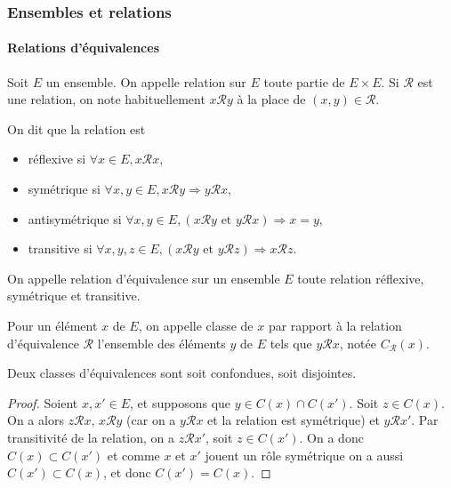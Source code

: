 \subsubsection{Ensembles et relations}

\paragraph{Relations d'équivalences}

\begin{de}
Soit $E$ un ensemble. On appelle relation sur $E$ toute
partie de $E \times E$. Si $\mathcal{R}$ est une relation, on note habituellement $x\mathcal{R}y$ à la
place de $(x,y) \in\mathcal{R}$.

On dit que la relation est

\begin{itemize}

\item
  réflexive si $\forall x \in E, x\mathcal{R}x$,
\item
  symétrique si $\forall x,y \in E, x\mathcal{R}y \Rightarrow y\mathcal{R}x$,
\item
  antisymétrique si $\forall x,y \in E, (x\mathcal{R}y\text{ et } y\mathcal{R}x) \Rightarrow x = y$,
\item
  transitive si $\forall x,y,z \in E, (x\mathcal{R}y\text{ et } y\mathcal{R}z) \Rightarrow x\mathcal{R}z$.
\end{itemize}
\end{de}

\begin{de}
On appelle relation d'équivalence sur un ensemble $E$
toute relation réflexive, symétrique et transitive.
\end{de}

\begin{de}
Pour un élément $x$ de $E$, on appelle classe de $x$ par
rapport à la relation d'équivalence $\mathcal{R}$ l'ensemble des éléments $y$ de $E$
tels que $y\mathcal{R}x$, notée $C_{\mathcal{R}}(x)$.
\end{de}

\begin{prop}
Deux classes d'équivalences sont soit confondues, soit
disjointes.
\end{prop}

\begin{proof}
Soient $x,x' \in E$, et supposons que $y \in C(x) \cap C(x')$. Soit $z \in C(x)$. On a alors $z\mathcal{R}x$, $x\mathcal{R}y$ (car on a $y\mathcal{R}x$ et la relation est symétrique)
et $y\mathcal{R}x'$. Par transitivité de la relation, on a $z\mathcal{R}x'$, soit $z \in C(x')$. On a
donc $C(x) \subset C(x')$ et comme $x$ et $x'$ jouent un rôle symétrique on a aussi
$C(x') \subset C(x)$, et donc $C(x') = C(x)$.
\end{proof}

